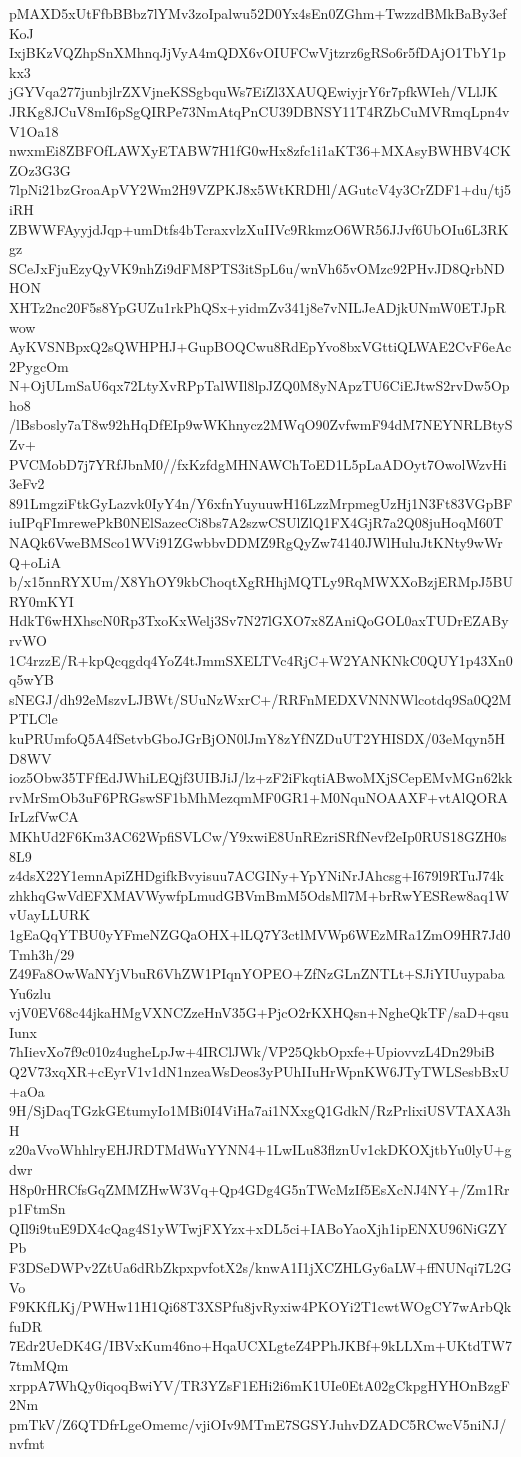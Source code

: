 pMAXD5xUtFfbBBbz7lYMv3zoIpalwu52D0Yx4sEn0ZGhm+TwzzdBMkBaBy3efKoJ
IxjBKzVQZhpSnXMhnqJjVyA4mQDX6vOIUFCwVjtzrz6gRSo6r5fDAjO1TbY1pkx3
jGYVqa277junbjlrZXVjneKSSgbquWs7EiZl3XAUQEwiyjrY6r7pfkWIeh/VLlJK
JRKg8JCuV8mI6pSgQIRPe73NmAtqPnCU39DBNSY11T4RZbCuMVRmqLpn4vV1Oa18
nwxmEi8ZBFOfLAWXyETABW7H1fG0wHx8zfc1i1aKT36+MXAsyBWHBV4CKZOz3G3G
7lpNi21bzGroaApVY2Wm2H9VZPKJ8x5WtKRDHl/AGutcV4y3CrZDF1+du/tj5iRH
ZBWWFAyyjdJqp+umDtfs4bTcraxvlzXuIIVc9RkmzO6WR56JJvf6UbOIu6L3RKgz
SCeJxFjuEzyQyVK9nhZi9dFM8PTS3itSpL6u/wnVh65vOMzc92PHvJD8QrbNDHON
XHTz2nc20F5s8YpGUZu1rkPhQSx+yidmZv341j8e7vNILJeADjkUNmW0ETJpRwow
AyKVSNBpxQ2sQWHPHJ+GupBOQCwu8RdEpYvo8bxVGttiQLWAE2CvF6eAc2PygcOm
N+OjULmSaU6qx72LtyXvRPpTalWIl8lpJZQ0M8yNApzTU6CiEJtwS2rvDw5Opho8
/lBsbosly7aT8w92hHqDfEIp9wWKhnycz2MWqO90ZvfwmF94dM7NEYNRLBtySZv+
PVCMobD7j7YRfJbnM0//fxKzfdgMHNAWChToED1L5pLaADOyt7OwolWzvHi3eFv2
891LmgziFtkGyLazvk0IyY4n/Y6xfnYuyuuwH16LzzMrpmegUzHj1N3Ft83VGpBF
iuIPqFImrewePkB0NElSazecCi8bs7A2szwCSUlZlQ1FX4GjR7a2Q08juHoqM60T
NAQk6VweBMSco1WVi91ZGwbbvDDMZ9RgQyZw74140JWlHuluJtKNty9wWrQ+oLiA
b/x15nnRYXUm/X8YhOY9kbChoqtXgRHhjMQTLy9RqMWXXoBzjERMpJ5BURY0mKYI
HdkT6wHXhscN0Rp3TxoKxWelj3Sv7N27lGXO7x8ZAniQoGOL0axTUDrEZAByrvWO
1C4rzzE/R+kpQcqgdq4YoZ4tJmmSXELTVc4RjC+W2YANKNkC0QUY1p43Xn0q5wYB
sNEGJ/dh92eMszvLJBWt/SUuNzWxrC+/RRFnMEDXVNNNWlcotdq9Sa0Q2MPTLCle
kuPRUmfoQ5A4fSetvbGboJGrBjON0lJmY8zYfNZDuUT2YHISDX/03eMqyn5HD8WV
ioz5Obw35TFfEdJWhiLEQjf3UIBJiJ/lz+zF2iFkqtiABwoMXjSCepEMvMGn62kk
rvMrSmOb3uF6PRGswSF1bMhMezqmMF0GR1+M0NquNOAAXF+vtAlQORAIrLzfVwCA
MKhUd2F6Km3AC62WpfiSVLCw/Y9xwiE8UnREzriSRfNevf2eIp0RUS18GZH0s8L9
z4dsX22Y1emnApiZHDgifkBvyisuu7ACGINy+YpYNiNrJAhcsg+I679l9RTuJ74k
zhkhqGwVdEFXMAVWywfpLmudGBVmBmM5OdsMl7M+brRwYESRew8aq1WvUayLLURK
1gEaQqYTBU0yYFmeNZGQaOHX+lLQ7Y3ctlMVWp6WEzMRa1ZmO9HR7Jd0Tmh3h/29
Z49Fa8OwWaNYjVbuR6VhZW1PIqnYOPEO+ZfNzGLnZNTLt+SJiYIUuypabaYu6zlu
vjV0EV68c44jkaHMgVXNCZzeHnV35G+PjcO2rKXHQsn+NgheQkTF/saD+qsuIunx
7hIievXo7f9c010z4ugheLpJw+4IRClJWk/VP25QkbOpxfe+UpiovvzL4Dn29biB
Q2V73xqXR+cEyrV1v1dN1nzeaWsDeos3yPUhIIuHrWpnKW6JTyTWLSesbBxU+aOa
9H/SjDaqTGzkGEtumyIo1MBi0I4ViHa7ai1NXxgQ1GdkN/RzPrlixiUSVTAXA3hH
z20aVvoWhhlryEHJRDTMdWuYYNN4+1LwILu83flznUv1ckDKOXjtbYu0lyU+gdwr
H8p0rHRCfsGqZMMZHwW3Vq+Qp4GDg4G5nTWcMzIf5EsXcNJ4NY+/Zm1Rrp1FtmSn
QIl9i9tuE9DX4cQag4S1yWTwjFXYzx+xDL5ci+IABoYaoXjh1ipENXU96NiGZYPb
F3DSeDWPv2ZtUa6dRbZkpxpvfotX2s/knwA1I1jXCZHLGy6aLW+ffNUNqi7L2GVo
F9KKfLKj/PWHw11H1Qi68T3XSPfu8jvRyxiw4PKOYi2T1cwtWOgCY7wArbQkfuDR
7Edr2UeDK4G/IBVxKum46no+HqaUCXLgteZ4PPhJKBf+9kLLXm+UKtdTW77tmMQm
xrppA7WhQy0iqoqBwiYV/TR3YZsF1EHi2i6mK1UIe0EtA02gCkpgHYHOnBzgF2Nm
pmTkV/Z6QTDfrLgeOmemc/vjiOIv9MTmE7SGSYJuhvDZADC5RCwcV5niNJ/nvfmt
